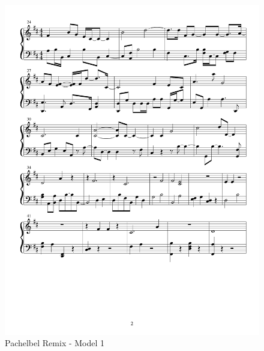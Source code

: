 \documentclass{article} %
\begin{document}
\begin{figure}[H]
\centering

\includegraphics [scale = 0.6] {PachelbelRemix-cropped.pdf}
\caption{Pachelbel Remix - Model 1\label{P1}}
\end{figure}
\end{document}
